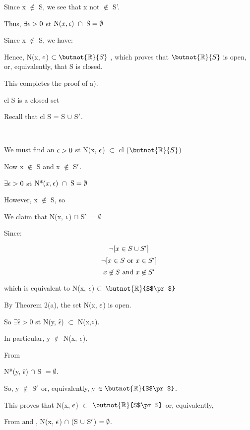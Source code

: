 \documentclass{article}
\begin{document}
Since x $\not\in$ S, we see that x not $\not\in$ S'.

Thus, $\exists \epsilon > 0$ st $\textrm{N(}x, \epsilon\textrm{) }\cap \textrm{ S} = \emptyset$ \

Since x $\not\in$ S, we have:


Hence, N(x, $\epsilon$) $\sbs \butnot{\br}{S}$ , which proves that $\butnot{\br}{S}$ is open, or, equivalently, that S is closed. \

This completes the proof of a).

cl S is a closed set \

Recall that cl S = S $\cup$ S$^\prime$.


 \

We must find an $\epsilon > 0$ st N(x, $\epsilon$) $\subset$ cl ($\butnot{\br}{S}$) \

Now x $\not\in$ S and x $\not\in$ S$^\prime$. \

$\exists \epsilon > 0$ st $\textrm{N*(}x, \epsilon\textrm{) }\cap \textrm{ S} = \emptyset$ \

However, x $\not\in$ S, so \


We claim that N(x, $\epsilon$) $\cap$ S' $= \emptyset$ \

Since:

\[\neg [x \in S \cup S^\prime]\]
\[\neg [x \in S \textrm{ or }x \in S^\prime]\]
\[x \not\in S \textrm{ and }x \not\in S^\prime\]

which is equivalent to N(x, $\epsilon$) $\subset$ $\butnot{\br}{S$\pr$}$ \


By Theorem 2(a), the set N(x, $\epsilon$) is open. \

So $\exists \hat{\epsilon} > 0$ st N(y, $\hat{\epsilon}$) $\subset$ N(x,$\epsilon$). \

In particular, y $\not\in$ N(x, $\epsilon$). \

From  \

N*(y, $\hat{\epsilon}$) $\cap$ S $= \emptyset$. \

So, y $\not\in$ S$^\prime$ or, equivalently, y $\in \butnot{\br}{S$\pr$}$.

This proves that N(x, $\epsilon$) $\subset$ $\butnot{\br}{S$\pr$}$ or, equivalently,


From  and , N(x, $\epsilon$) $\cap$ (S $\cup$ S$^\prime$) $= \emptyset$. \
\end{document}

